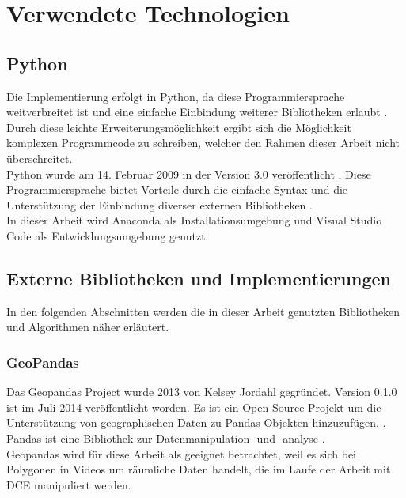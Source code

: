 \chapter{Verwendete Technologien}

\section{Python} 
{  \label{sec:Python}
	Die Implementierung erfolgt in Python, da diese Programmiersprache weitverbreitet ist und eine einfache Einbindung weiterer Bibliotheken erlaubt \citep{Millman2011}. Durch diese leichte Erweiterungsmöglichkeit ergibt sich die Möglichkeit komplexen Programmcode zu schreiben, welcher den Rahmen dieser Arbeit nicht überschreitet. \\
	Python wurde am 14. Februar 2009 in der Version 3.0 veröffentlicht \citep{Rossum2009}. Diese Programmiersprache bietet Vorteile durch die einfache Syntax und die Unterstützung der Einbindung diverser externen Bibliotheken \citep{Marowka2018}. \\
	In dieser Arbeit wird Anaconda als Installationsumgebung und Visual Studio Code als Entwicklungsumgebung genutzt. }

\section{Externe Bibliotheken und Implementierungen}
	In den folgenden Abschnitten werden die in dieser Arbeit genutzten Bibliotheken und Algorithmen näher erläutert.
		\subsection{GeoPandas}
		{ \label{subsec:Geopandas}
			Das Geopandas Project wurde 2013 von Kelsey Jordahl gegründet. Version 0.1.0 ist im Juli 2014 veröffentlicht worden. Es ist ein Open-Source Projekt um die Unterstützung von geographischen Daten zu Pandas Objekten hinzuzufügen. \citep{kelsey_jordahl_2020_3946761}. Pandas ist eine Bibliothek zur Datenmanipulation- und -analyse \citep{reback2020pandas}.  \\
			Geopandas wird für diese Arbeit als geeignet betrachtet, weil es sich bei Polygonen in Videos um räumliche Daten handelt, die im Laufe der Arbeit mit DCE manipuliert werden.
		}
